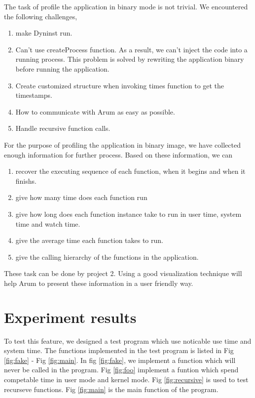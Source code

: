 \documentclass[11pt,letterpaper,oneside]{article}
\begin{document}
The task of profile the application in binary mode is not trivial. We encountered the following challenges,
\begin{enumerate}
\item make Dyninst run.
\item Can't use createProcess function. As a result, we can't inject the code into a running process. This problem is solved by rewriting the application binary before running the application.
\item Create customized structure when invoking times function to get the timestamps.
\item How to communicate with Arum as easy as possible.
\item Handle recursive function calls.
\end{enumerate}

For the purpose of profiling the application in binary image, we have collected enough information for further process. Based on these information, we can
\begin{enumerate}
\item recover the executing sequence of each function, when it begins and when it finishs.
\item give how many time does each function run
\item give how long does each function instance take to run in user time, system time and watch time.
\item give the average time each function takes to run.
\item give the calling hierarchy of the functions in the application.
\end{enumerate}
These task can be done by project 2. Using a good visualization technique will help Arum to present these information in a user friendly way.

\section{Experiment results}
To test this feature, we designed a test program which use noticable use time and system time. The functions implemented in the test program is listed in Fig \ref{fig:fake} - Fig \ref{fig:main}. In fig \ref{fig:fake}, we implement a function which will never be called in the program. Fig \ref{fig:foo} implement a funtion which spend competable time in user mode and kernel mode. Fig \ref{fig:recursive} is used to test recurseve functions. Fig \ref{fig:main} is the main function of the program.
\end{document}
